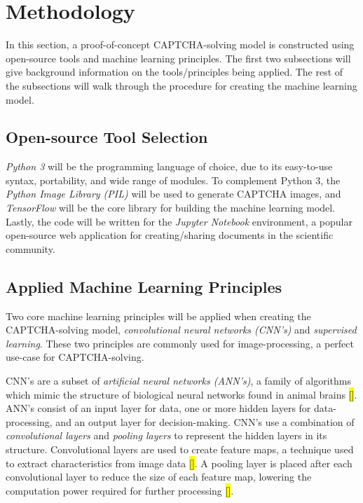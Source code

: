 \documentclass[11pt,conference]{IEEEtran}
\begin{document}
\section{Methodology}

In this section, a proof-of-concept CAPTCHA-solving model is constructed using
open-source tools and machine learning principles. The first two subsections
will give background information on the tools/principles being applied. The
rest of the subsections will walk through the procedure for creating the machine
learning model.

\subsection{Open-source Tool Selection}
\emph{Python 3} will be the programming language of choice, due to its
easy-to-use syntax, portability, and wide range of modules. To complement
Python 3, the \emph{Python Image Library (PIL)} will be used to generate
CAPTCHA images, and \emph{TensorFlow} will be the core library for building the
machine learning model. Lastly, the code will be written for the \emph{Jupyter
Notebook} environment, a popular open-source web application for creating/sharing
documents in the scientific community.

\subsection{Applied Machine Learning Principles}
Two core machine learning principles will be applied when creating the
CAPTCHA-solving model, \emph{convolutional neural networks (CNN's)} and
\emph{supervised learning}. These two principles are commonly used for
image-processing, a perfect use-case for CAPTCHA-solving.

CNN's are a subset of \emph{artificial neural networks (ANN's)}, a family of algorithms
which mimic the structure of biological neural networks found in animal brains
\hl{[]}.
ANN's consist of an input layer for data, one or more hidden layers for
data-processing, and an output layer for decision-making. CNN's use
a combination of \emph{convolutional layers} and \emph{pooling layers} to
represent the hidden layers in its structure. Convolutional layers are used to
create feature maps, a technique used to extract characteristics from image
data \hl{[]}. A pooling layer is placed after each convolutional layer to reduce the
size of each feature map, lowering the computation power required for
further processing \hl{[]}.
\end{document}
